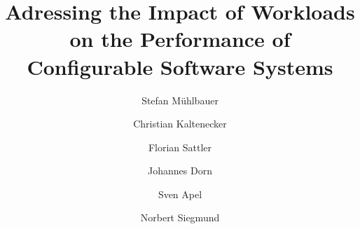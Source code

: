 \documentclass[sigconf,screen,anonymous]{acmart}
\begin{document}
	
	\title[Adressing the Impact of Workloads on the Performance of Configurable Software Systems]{\texorpdfstring{Adressing the Impact of Workloads on the Performance of\\ Configurable Software Systems}{Adressing the Impact of Workloads on the Performance of Configurable Software Systems}}
	
	\author{Stefan Mühlbauer}

	\author{Christian Kaltenecker}
	
	\author{Florian Sattler}

	\author{Johannes Dorn}

	\author{Sven Apel}

	\author{Norbert Siegmund}
	
	

	
	\renewcommand{\shortauthors}{Mühlbauer et al.}
	
	
	
\end{document}
